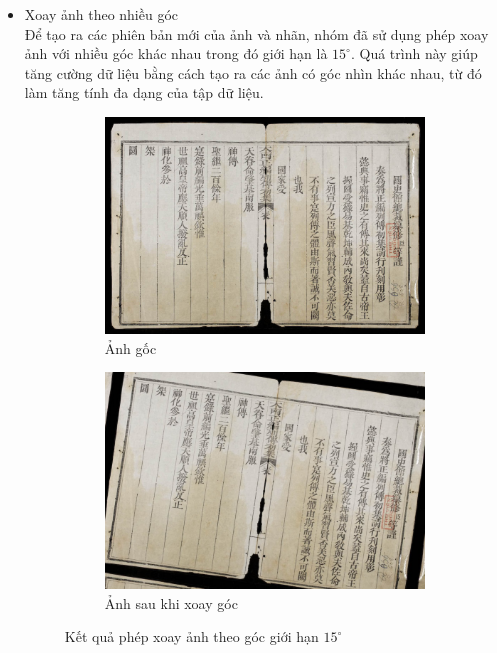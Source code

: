 \documentclass[a4paper,12pt]{article}
\begin{document}
\begin{itemize}
    \item Xoay ảnh theo nhiều góc
    \\Để tạo ra các phiên bản mới của ảnh và nhãn, nhóm đã sử dụng phép xoay ảnh với nhiều góc khác nhau trong đó giới hạn là $15^\circ$. Quá trình này giúp tăng cường dữ liệu bằng cách tạo ra các ảnh có góc nhìn khác nhau, từ đó làm tăng tính đa dạng của tập dữ liệu.
    
    \begin{figure}[H]
        \centering
        \begin{subfigure}{.4\textwidth}
          \includegraphics[width=1\linewidth]{images/original_img_1.jpg}
          \caption{Ảnh gốc}
        \end{subfigure}
        \hspace{20mm}
        \begin{subfigure}{.4\textwidth}
          \includegraphics[width=1\linewidth]{images/rotated_img.png}
          \caption{Ảnh sau khi xoay góc}
        \end{subfigure}
        \caption{Kết quả phép xoay ảnh theo góc giới hạn $15^\circ$}
    \end{figure}


\end{itemize}
\end{document}
